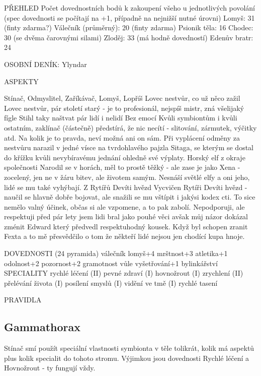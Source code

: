 \documentclass[../../main.tex]{subfiles}
\begin{document}
PŘEHLED
Počet dovednostních bodů k zakoupení všeho u jednotlivých povolání (spec dovednosti se počítají na +1, případně na nejnižší nutné úrovni)
Lomyš: 31 (finty zdarma?)
Válečník (průměrný): 20 (finty zdarma)
Psionik těla: 16
Chodec: 30 (se dvěma čarovnými silami)
Zloděj: 33 (má hodně dovedností)
Edenův bratr: 24 


OSOBNÍ DENÍK: Ylyndar

ASPEKTY

Stínač, Odmyslitel, Zaříkávač, Lomyš, Lopříš
Lovec nestvůr, co už něco zažil
Lovec nestvůr, pár století starý - je to profesionál, nejspíš mistr, zná všelijaký fígle
Stihl taky naštvat pár lidí i nelidí
Bez emocí
Kvůli symbiontům i kvůli ostatním, zaklínač (částečně) předstírá, že nic necítí - slitování, zármutek, výčitky atd. Na kolik je to pravda, neví možná ani on sám. Při vyplácení odměny za nestvůru narazil v jedné vísce na tvrdohlavého pajzla Sitaga, se kterým se dostal do křížku kvůli nevybíravému jednání ohledně své výplaty.
Horský elf z okraje společnosti
Narodil se v horách, měl to prostě těžký - ale zase je jako Xena - zocelený, jen ne v žáru bitev, ale životem samým. Nesnáší světlé elfy a oni jeho, lidé se mu také vyhýbají.
Z Rytířů Devíti hvězd
Vycvičen Rytíři Devíti hvězd - naučil se hlavně dobře bojovat, ale snažili se mu vštípit i jakýsi kodex cti. To sice nemělo valný účinek, občas si ale vzpomene, a to pak zabolí.
Nepodporuji, ale respektuji
před pár lety jsem lidi bral jako pouhé věci avšak můj názor dokázal zménit Edward který předvedl respektuhodný kousek. Když byl schopen zranit Fexta a to mě přesvědčilo o tom že někteří lidé nejsou jen chodící kupa hnoje.


DOVEDNOSTI (24 pyramida)
válečník lomyš+4
mrštnost+3
atletika+1
odolnost+2
pozornost+2
gramotnost
vůle
vyšetřování+1
bylinkářství
SPECIALITY
rychlé léčení (II)
pevné zdraví (I)
hovnožrout (I)
zrychlení (II)
přelévání života (I)
posílení smyslů (I)
vidění ve tmě (I)
rychlé tasení


PRAVIDLA

\subsection{Gammathorax}
\label{sec:lopr-gamma}

Stínač smí použít speciální vlastnosti symbionta v těle tolikrát, kolik má aspektů plus kolik specialit do tohoto stromu. Výjimkou jsou dovednosti Rychlé léčení a Hovnožrout - ty fungují vždy.\\
\end{document}
